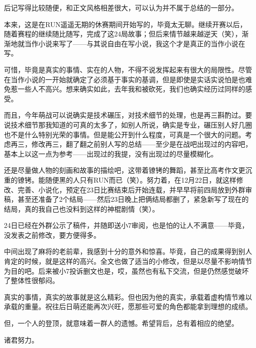 后记写得比较随便，和正文风格相差很大，可以认为并不属于总结的一部分。

本来，这是在RUN遥遥无期的休赛期间开始写的，毕竟太无聊。继续开赛以后，随着赛程的继续随比随写，完成了这24局故事；但后来情节越来越逆天（笑），渐渐地就当作小说来写了——与其说自由在写小说，我这个才是真正的当作小说在写。

可惜，毕竟是真实的事情、实在的人物，不得不说发挥起来有很大的局限性。尽管在当作小说的一开始就确定了必须基于事实的基调，但是即使是实话实说怕是也难免惹一些人不高兴。想来确实如此，去年我和被砍死，我们也确实经历过同样的感受。

而且，今年萌战可以说确实是技术碾压，对技术细节的处理，也是再三斟酌过。要说技术细节那我知道的可真的太多了，如别人所说，确实是专业，碾压别人好几圈也不是什么特别光荣的事情。但是能公开到什么程度，可真是一个很大的问题。考虑再三，修改再三，翻了翻之前别人写的总结——至少是在战吧出现过的内容吧，基本上以这一点为参考——出现过的我提，没有出现过的尽量模糊化。

还是尽量做人物的刻画和故事的描绘吧，这带着镣铐的舞蹈，甚至比高考作文更沉重的镣铐。能随便黑的人只有RUN而已（笑）。努力着，在12月22日，就这样修改、完善、小说化，预定在23日比赛结束后开始连载，并早早将前四局放到外群审稿，甚至还准备了2个结局——然后23日晚上把俩结局都删了，紧急新写了现在的结局，真的我自己也没料到这样的神棍剧情（笑）。

24日已经在外群公示了稿件，并随即送小7审阅，也是怕的让人不满意——毕竟，没发表之前修改，要方便得多。

中间出现了麻将的老前辈，我感到十分的意外和惊喜。毕竟，自己的成果得到别人肯定的时候，就是这样的高兴。全文也做了适当的小修改，但是以尽量不影响情节为目的吧。后来被小7投诉删文也是，哎，虽然也有私下交流，但是仍然感觉破坏了整体性很郁闷。

真实的事情，真实的故事就是这么精彩。但也因为他的真实，承载着虚构情节难以承载的重量。祝往后日萌还能再次兴旺，愿那些可爱的角色都能拿到理想的成绩。

但，一个人的登顶，就意味着一群人的遗憾。希望背后，总有着相应的绝望。

诸君努力。
